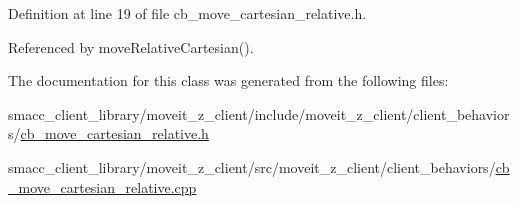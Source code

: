 Definition at line 19 of file cb\+\_\+move\+\_\+cartesian\+\_\+relative.\+h.



Referenced by move\+Relative\+Cartesian().



The documentation for this class was generated from the following files\+:\begin{DoxyCompactItemize}
\item 
smacc\+\_\+client\+\_\+library/moveit\+\_\+z\+\_\+client/include/moveit\+\_\+z\+\_\+client/client\+\_\+behaviors/\hyperlink{cb__move__cartesian__relative_8h}{cb\+\_\+move\+\_\+cartesian\+\_\+relative.\+h}\item 
smacc\+\_\+client\+\_\+library/moveit\+\_\+z\+\_\+client/src/moveit\+\_\+z\+\_\+client/client\+\_\+behaviors/\hyperlink{cb__move__cartesian__relative_8cpp}{cb\+\_\+move\+\_\+cartesian\+\_\+relative.\+cpp}\end{DoxyCompactItemize}
